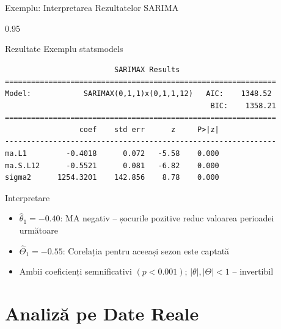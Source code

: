 \documentclass[9pt, aspectratio=169, t]{beamer}
\begin{document}
\begin{frame}[fragile]{Exemplu: Interpretarea Rezultatelor SARIMA}
    \begin{cminipage}{0.95\textwidth}
    \begin{block}{Rezultate Exemplu statsmodels}
        \scriptsize
        \begin{verbatim}
                         SARIMAX Results
==============================================================
Model:            SARIMAX(0,1,1)x(0,1,1,12)   AIC:    1348.52
                                               BIC:    1358.21
==============================================================
                 coef    std err      z     P>|z|
--------------------------------------------------------------
ma.L1         -0.4018      0.072   -5.58    0.000
ma.S.L12      -0.5521      0.081   -6.82    0.000
sigma2      1254.3201    142.856    8.78    0.000
        \end{verbatim}
    \end{block}
    \vspace{-0.1cm}
    \begin{exampleblock}{Interpretare}
        \footnotesize
        \begin{itemize}\setlength{\itemsep}{0pt}
            \item $\hat{\theta}_1 = -0.40$: MA negativ -- șocurile pozitive reduc valoarea perioadei următoare
            \item $\hat{\Theta}_1 = -0.55$: Corelația pentru aceeași sezon este captată
            \item Ambii coeficienți semnificativi $(p < 0.001)$; $|\theta|, |\Theta| < 1$ -- invertibil
        \end{itemize}
    \end{exampleblock}
    \end{cminipage}
\end{frame}

\section{Analiză pe Date Reale}
\end{document}
